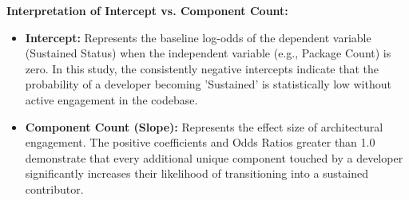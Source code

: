\textbf{Interpretation of Intercept vs. Component Count:}
\begin{itemize}
    \item \textbf{Intercept:} Represents the baseline log-odds of the dependent variable (Sustained Status) when the independent variable (e.g., Package Count) is zero. In this study, the consistently negative intercepts indicate that the probability of a developer becoming 'Sustained' is statistically low without active engagement in the codebase.
    \item \textbf{Component Count (Slope):} Represents the effect size of architectural engagement. The positive coefficients and Odds Ratios greater than 1.0 demonstrate that every additional unique component touched by a developer significantly increases their likelihood of transitioning into a sustained contributor.
\end{itemize}
